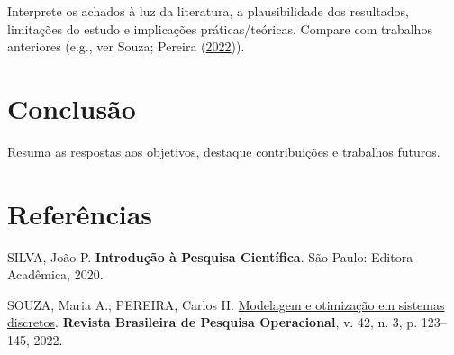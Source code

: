 \documentclass[
  12pt,
  a4paper,
]{article}
\newlength{\cslhangindent}
\newlength{\cslentryspacingunit} %
\newenvironment{CSLReferences}[2] %
 {%
  \setlength{\parindent}{0pt}
  \ifodd #1
  \let\oldpar\par
  \def\par{\hangindent=\cslhangindent\oldpar}
  \fi
  \setlength{\parskip}{#2\cslentryspacingunit}
 }%
 {}
\begin{document}
Interprete os achados à luz da literatura, a plausibilidade dos
resultados, limitações do estudo e implicações práticas/teóricas.
Compare com trabalhos anteriores (e.g., ver Souza; Pereira
(\protect\hyperlink{ref-souza2022}{2022})).

\hypertarget{conclusuxe3o}{%
\section{Conclusão}\label{conclusuxe3o}}

Resuma as respostas aos objetivos, destaque contribuições e trabalhos
futuros.

\hypertarget{bibliography}{%
\section*{Referências}\label{bibliography}}

\hypertarget{refs}{}
\begin{CSLReferences}{0}{1}
\leavevmode{}%
SILVA, João P. \textbf{Introdução à Pesquisa Científica}. São Paulo:
Editora Acadêmica, 2020.

\leavevmode{}%
SOUZA, Maria A.; PEREIRA, Carlos H.
\href{https://doi.org/10.1234/rbpo.v42i3.2022}{Modelagem e otimização em
sistemas discretos}. \textbf{Revista Brasileira de Pesquisa
Operacional}, v. 42, n. 3, p. 123--145, 2022.

\end{CSLReferences}
\end{document}
